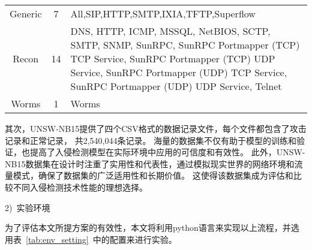 \begin{table}[htbp]
\begin{tabularx}{\textwidth}{@{}ccX@{}}
		Generic                           & 7                                 & All,SIP,HTTP,SMTP,IXIA,TFTP,Superflow                                                                                                                                                                                                                                                                                                                                                                                                                                                                                                                               \\
		Recon                             & 14                                & DNS, HTTP, ICMP, MSSQL, NetBIOS, SCTP, SMTP, SNMP, SunRPC, SunRPC Portmapper (TCP) TCP Service, SunRPC Portmapper (TCP) UDP Service, SunRPC Portmapper (UDP) TCP Service, SunRPC Portmapper (UDP) UDP Service, Telnet                                                                                                                                                                                                                                                                                                                                               \\
		Worms                             & 1                                 & Worms                                                                                                                                                                                                                                                                                                                                                                                                                                                                                                                                                               \\
		\bottomrule
	\end{tabularx}
\end{table}\par

其次，UNSW-NB15提供了四个CSV格式的数据记录文件，每个文件都包含了攻击记录和正常记录，
共2,540,044条记录。
海量的数据集不仅有助于模型的训练和验证，也提高了入侵检测模型在实际环境中应用的可信度和有效性。
此外，UNSW-NB15数据集在设计时注重了实用性和代表性，通过模拟现实世界的网络环境和流量模式，确保了数据集的广泛适用性和长期价值。
这使得该数据集成为评估和比较不同入侵检测技术性能的理想选择。\par
2)~实验环境\par
为了评估本文所提方案的有效性，本文将利用python语言来实现以上流程，并选用表~\ref{tab:env_setting}~中的配置来进行实验。


